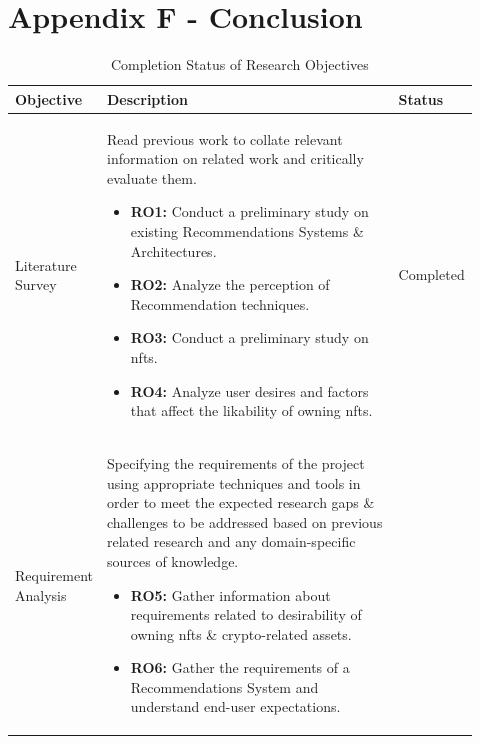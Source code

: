 \chapter{Appendix F - Conclusion}
\label{appendix:conclusion}

\vspace{-4mm}
\begin{longtable}{| p{0.135\linewidth} | p{0.63\linewidth}| p{0.15\linewidth}|}
\caption{Completion Status of Research Objectives}
\label{tab:research-objectives-status-table}\\
\hline
Objective &  Description & Status \\ 
\hline
Literature Survey & Read previous work to collate relevant information on related work and critically evaluate them.
\begin{itemize}
\item \textbf{RO1:} Conduct a preliminary study on existing Recommendations Systems \& Architectures.
\item \textbf{RO2:} Analyze the perception of Recommendation techniques.
\item \textbf{RO3:} Conduct a preliminary study on \Gls{nft}s.
\item \textbf{RO4:} Analyze user desires and factors that affect the likability of owning \Gls{nft}s.
\vspace{-7mm}       %
\end{itemize}
&
Completed\\
\hline
Requirement Analysis &  Specifying the requirements of the project using appropriate techniques and tools in order to meet the expected research gaps \& challenges to be addressed based on previous related research and any domain-specific sources of knowledge.
\begin{itemize}
\item \textbf{RO5:} Gather information about requirements related to desirability of owning \Gls{nft}s \& crypto-related assets.
\item \textbf{RO6:} Gather the requirements of a Recommendations System and understand end-user expectations.

\end{itemize}
\end{longtable}
